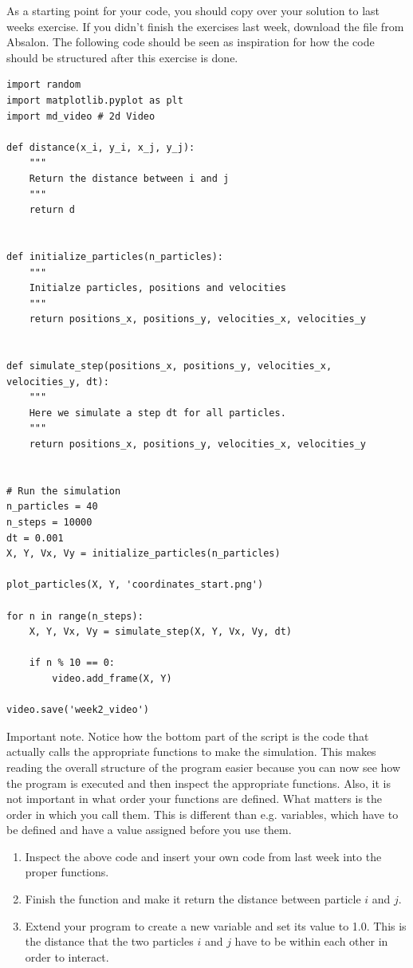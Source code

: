 \documentclass{article}
\begin{document}
As a starting point for your code, you should copy over your solution to last
weeks exercise. If you didn't finish the exercises last week, download the file
 from Absalon. The following code should be seen as
inspiration for how the code should be structured after this exercise is done.

\begin{lstlisting}
import random
import matplotlib.pyplot as plt
import md_video # 2d Video

def distance(x_i, y_i, x_j, y_j):
    """
    Return the distance between i and j
    """
    return d


def initialize_particles(n_particles):
    """
    Initialze particles, positions and velocities
    """
    return positions_x, positions_y, velocities_x, velocities_y


def simulate_step(positions_x, positions_y, velocities_x, velocities_y, dt):
    """
    Here we simulate a step dt for all particles.
    """
    return positions_x, positions_y, velocities_x, velocities_y


# Run the simulation
n_particles = 40
n_steps = 10000
dt = 0.001
X, Y, Vx, Vy = initialize_particles(n_particles)

plot_particles(X, Y, 'coordinates_start.png')

for n in range(n_steps):
    X, Y, Vx, Vy = simulate_step(X, Y, Vx, Vy, dt)

    if n % 10 == 0:
        video.add_frame(X, Y)

video.save('week2_video')

\end{lstlisting}

\newpage
Important note.
Notice how the bottom part of the script is the code that actually calls the
appropriate functions to make the simulation.  This makes reading the overall
structure of the program easier because you can now see how the program is
executed and then inspect the appropriate functions.  Also, it is not important
in what order your functions are defined. What matters is the order in which you
call them. This is different than e.g. variables, which have to be defined and have a value assigned before you use them.

\begin{enumerate}
  \setcounter{enumi}{0}
  \item Inspect the above code and insert your own code from last week into the proper functions.

  \item Finish the function  and make it return
    the distance  between particle $i$ and $j$.

    \item Extend your program to create a new variable  and set its
    value to 1.0.
    This is the distance that the two particles $i$ and $j$ have to be within each other
    in order to interact.

\end{enumerate}
\end{document}

